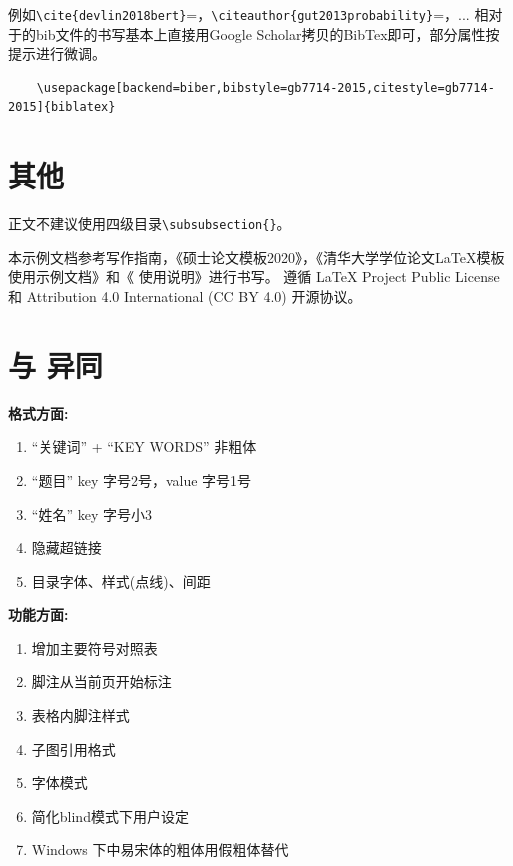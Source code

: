 例如\verb|\cite{devlin2018bert}|=\cite{devlin2018bert}，\verb|\citeauthor{gut2013probability}|=\citeauthor{gut2013probability}，...
相对于的bib文件的书写基本上直接用Google Scholar拷贝的BibTex即可，部分属性按提示进行微调。
\begin{Verbatim}
    \usepackage[backend=biber,bibstyle=gb7714-2015,citestyle=gb7714-2015]{biblatex}
\end{Verbatim}

\section{其他}
\label{sec:other}

正文不建议使用四级目录\verb|\subsubsection{}|。

本示例文档参考写作指南，《硕士论文模板2020》，《清华大学学位论文\LaTeX{}模板使用示例文档》和《\pkuthss{} 使用说明》进行书写。
遵循 \LaTeX{} Project Public License 和 Attribution 4.0 International (CC BY 4.0) 开源协议。

\section{与\pkuthss{} \iofubaseversion{}异同}

\textbf{格式方面:}

\begin{enumerate}
    \item ``关键词” + ``KEY WORDS” 非粗体 
    \item ``题目” key 字号2号，value 字号1号
    \item ``姓名” key 字号小3
    \item 隐藏超链接
    \item 目录字体、样式(点线)、间距
\end{enumerate}

\textbf{功能方面:}

\begin{enumerate}
    \item 增加主要符号对照表
    \item 脚注从当前页开始标注
    \item 表格内脚注样式
    \item 子图引用格式
    \item 字体模式
    \item 简化blind模式下用户设定
    \item Windows 下中易宋体的粗体用假粗体替代
\end{enumerate}

